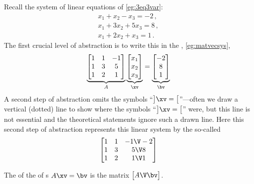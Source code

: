 \begin{example} 
Recall the system of linear equations of \cref{eg:3eq3var}:
\begin{equation*}
\begin{array}{l}
x_1+x_2-x_3=-2\,,\\
x_1+3x_2+5x_3=8\,,\\
x_1+2x_2+x_3=1\,.
\end{array}
\end{equation*}
The first crucial level of abstraction is to write this in the , \cref{eg:matvecsys},
\begin{equation*}
\underbrace{\begin{bmatrix} 1&1&-1\\ 1&3&5\\1&2&1 \end{bmatrix}}_A
\underbrace{\begin{bmatrix} x_1\\x_2\\x_3 \end{bmatrix}}_\xv
=\underbrace{\begin{bmatrix} -2\\8\\1 \end{bmatrix}}_\bv 
\end{equation*}
A second step of abstraction omits the symbols ``\(\big]\xv=\big[\)''---often we draw a vertical (dotted) line to show where the symbols ``\(\big]\xv=\big[\)'' were, but this line is not essential and the theoretical statements ignore such a drawn line.
Here this second step of abstraction represents this linear system by the so-called 
\begin{equation*}
\begin{bmatrix} 1&1&-1\V -2\\ 1&3&5\V 8\\1&2&1\V 1 \end{bmatrix}
\end{equation*}
\end{example}


\begin{definition} \label{def:augmat}
The  of the  of s \(A\xv=\bv\) is the matrix \(\begin{bmatrix} A\V \bv \end{bmatrix}\).
\end{definition}

